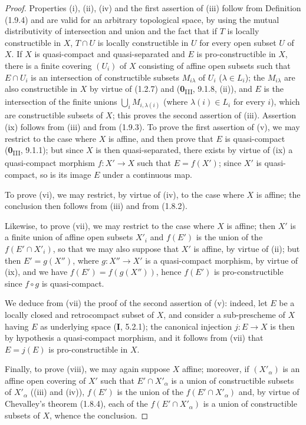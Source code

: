 \begin{proof}
Properties (i), (ii), (iv) and the first assertion of (iii) follow
from Definition (1.9.4) and are valid for an arbitrary topological space,
by using the mutual distributivity of intersection and union and the fact
that if $T$ is locally constructible in $X$, $T\cap U$ is locally
constructible in $U$ for every open subset $U$ of $X$.
If $X$ is quasi-compact and quasi-separated and $E$ is pro-constructible in
$X$, there is a finite covering $(U_i)$ of $X$ consisting of affine open
subsets such that $E\cap U_i$ is an intersection of constructible subsets
$M_{i\lambda}$ of $U_i$ ($\lambda\in L_i$); the $M_{i\lambda}$ are also
constructible in $X$ by virtue of (1.2.7) and (\textbf{0}\textsubscript{III}, 9.1.8,
(ii)), and $E$ is the intersection of the finite unions
$\bigcup_iM_{i,\lambda(i)}$ (where $\lambda(i)\in L_i$ for every $i$), which
are constructible subsets of $X$; this proves the second assertion of (iii).
Assertion (ix) follows from (iii) and from (1.9.3). To prove the first
assertion of (v), we may restrict to the case where $X$ is affine, and then
prove that $E$ is quasi-compact (\textbf{0}\textsubscript{III}, 9.1.1); but since $X$
is then quasi-separated, there exists by virtue of (ix) a quasi-compact
morphism $f:X'\to X$ such that $E=f(X')$; since $X'$ is quasi-compact, so is
its image $E$ under a continuous map.

To prove (vi), we may restrict, by virtue of (iv), to the case where $X$ is
affine; the conclusion then follows from (iii) and from (1.8.2).


Likewise, to prove (vii), we may restrict to the case where $X$ is affine;
then $X'$ is a finite union of affine open subsets $X'_i$ and $f(E')$ is the
union of the $f(E'\cap X'_i)$, so that we may also suppose that $X'$ is
affine, by virtue of (ii); but then $E'=g(X'')$, where $g:X''\to X'$ is a
quasi-compact morphism, by virtue of (ix), and we have $f(E')=f(g(X''))$,
hence $f(E')$ is pro-constructible since $f\circ g$ is quasi-compact.

We deduce from (vii) the proof of the second assertion of (v): indeed,
let $E$ be a locally closed and retrocompact subset of $X$, and consider a
sub-prescheme of $X$ having $E$ as underlying space (\textbf{I},
5.2.1); the canonical injection $j:E\to X$ is then by hypothesis a
quasi-compact morphism, and it follows from (vii) that $E=j(E)$ is
pro-constructible in $X$.

Finally, to prove (viii), we may again suppose $X$ affine; moreover, if
$(X'_\alpha)$ is an affine open covering of $X'$ such that
$E'\cap X'_\alpha$ is a union of constructible subsets of $X'_\alpha$
((iii) and (iv)), $f(E')$ is the union of the $f(E'\cap X'_\alpha)$ and, by
virtue of Chevalley's theorem (1.8.4), each of the $f(E'\cap X'_\alpha)$ is
a union of constructible subsets of $X$, whence the conclusion.
\end{proof}


